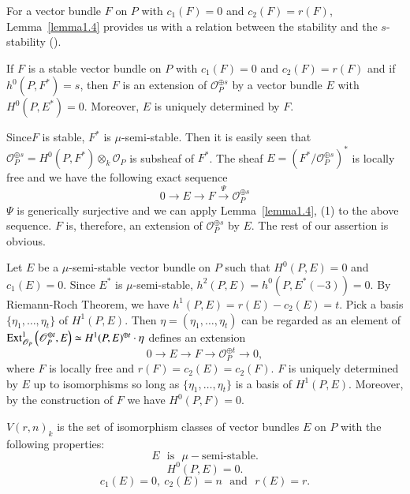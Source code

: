 For a vector bundle $F$ on $P$ with $c_1(F)=0$ and $c_2(F)=r(F)$,
Lemma~\ref{lemma1.4} provides us with a relation between the stability
and the $s$-stability (\cite{key7}).

\begin{cor}\label{cor1.4.1}
If $F$ is a stable vector bundle on $P$ with $c_1(F)=0$ and
$c_2(F)=r(F)$ and if $h^{0}(P,F^{\ast})=s$, then $F$ is an extension
of $\mathscr{O}^{\oplus s}_P$ by a vector bundle $E$ with
$H^{0}(P,E^{\ast})=0$. Moreover, $E$ is uniquely determined by $F$. 
\end{cor}

\begin{Proof}
Since\pageoriginale $F$ is stable,  $F^{\ast}$ is $\mu$-semi-stable. Then it is
easily seen that $\mathscr{O}^{\oplus
  s}_P=H^{0}(P,F^{\ast})\otimes_{k}\mathscr{O}_P$ is subsheaf of
$F^{\ast}$. The sheaf $E=\left(F^{\ast}/\mathscr{O}^{\oplus
    s}_P\right)^{\ast}$ is locally free and we have the following
exact sequence
$$
0\rightarrow E\rightarrow F\xrightarrow{\Psi}\mathscr{O}^{\oplus s}_P
$$
$\Psi$  is generically surjective and we can apply
Lemma~\ref{lemma1.4}, (1) to the above sequence. $F$ is, therefore, an
extension of $\mathscr{O}^{\oplus s}_P$ by $E$. The rest of our
assertion is obvious.

Let $E$ be a $\mu$-semi-stable vector bundle on $P$ such that
$H^{0}(P, E)=0$ and $c_1(E)=0$. Since $E^{\ast}$ is $\mu$-semi-stable,
$h^{2}(P,E)=h^{0}(P,E^{\ast}(-3))=0$. By Riemann-Roch Theorem, we have
$h^{1}(P,E)=r(E)-c_2(E)=t$. Pick a basis $\{\eta_1,\ldots,\eta_t\}$
of $H^{1}(P,E)$. Then $\eta=(\eta_1,\ldots,\eta_t)$ can be regarded as
an element of $\operatorname{Ext}^{1}_{\mathscr{O}_P}\left(\mathscr{O}^{\oplus t}_P,
E\right)\simeq H^{1}(P,E)^{\oplus t}\cdot \eta$ defines an extension
$$
0\to E\to F\to \mathscr{O}^{\oplus t}_P\to 0,
$$
where $F$ is locally free and $r(F)=c_2(E)=c_2(F)$. $F$ is uniquely
determined by $E$ up to isomorphisms so long as
$\{\eta_1,\ldots,\eta_t\}$ is a basis of $H^{1}(P,E)$. Moreover, by
the construction of $F$ we have $H^{0}(P,F)=0$.
\enprf
\end{Proof}

\begin{dfn}\label{dfn1.5}
$V(r,n)_k$ is the set of isomorphism classes of vector bundles $E$ on
  $P$ with the following properties:
\begin{equation}\label{eqn1.5.1}
E \text{~ is~ } \mu-\text{semi-stable.}
\end{equation}
\begin{equation}\label{eqn1.5.2}
H^{0}(P,E)=0.
\end{equation}
\begin{equation}\label{eqn1.5.3}
c_1(E)=0, \ c_2(E)=n\text{~ and~ } r(E)=r.
\end{equation}
\end{dfn}

